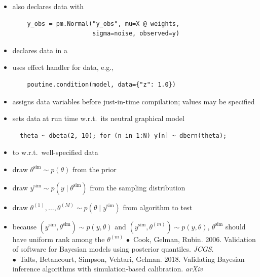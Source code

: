 \documentclass[10pt]{report}
\newcommand{\draw}[2]{#1^{(#2)}}
\newcommand{\simvar}[1]{#1^{\textrm{sim}}}
\begin{document}
\begin{itemize}
\item {} also declares data with 
\vspace*{-6pt}
{\footnotesize 
\begin{verbatim}
    y_obs = pm.Normal("y_obs", mu=X @ weights, 
                      sigma=noise, observed=y) 
\end{verbatim}
\vspace*{-8pt}
}
\item {} declares data in a 
\item {} uses effect handler  for data, e.g., 
\vspace*{-6pt}
{\footnotesize 
\begin{verbatim}
    poutine.condition(model, data={"z": 1.0})
\end{verbatim}
\vspace*{-8pt}
}
\item {} assigns data variables before
  just-in-time compilation; values may be specified
\item {} sets data at run time w.r.t.\ its neutral graphical model
\vspace*{-12pt}
{\footnotesize 
\begin{verbatim}
  theta ~ dbeta(2, 10); for (n in 1:N) y[n] ~ dbern(theta); 
\end{verbatim}}
\end{itemize}


\begin{itemize}
\item to  w.r.t.\ well-specified data
  \item draw $\simvar{\theta} \sim p(\theta)$ from the prior
  \item draw $\simvar{y} \sim p(y \mid \simvar{\theta})$ from the
    sampling distribution
  \item draw $\draw{\theta}{1}, \ldots, \draw{\theta}{M} \sim p(\theta
    \mid \simvar{y})$ from algorithm to test
  \item because $(\simvar{y}, \simvar{\theta}) \sim p(y, \theta)$ and
    $(\simvar{y}, \draw{\theta}{m}) \sim p(y, \theta)$,
    $\simvar{\theta}$ should have uniform rank among the
    $\draw{\theta}{m}$
    \vfill
    {\tiny $\bullet$\ Cook,  Gelman, Rubin.
      2006. Validation of software for Bayesian models using posterior
      quantiles. \textit{JCGS}.
      \\
      $\bullet$\ Talts, Betancourt, Simpson, Vehtari, Gelman. 2018. Validating Bayesian inference algorithms with simulation-based calibration. \textit{arXiv}}
\end{itemize}
\end{document}
